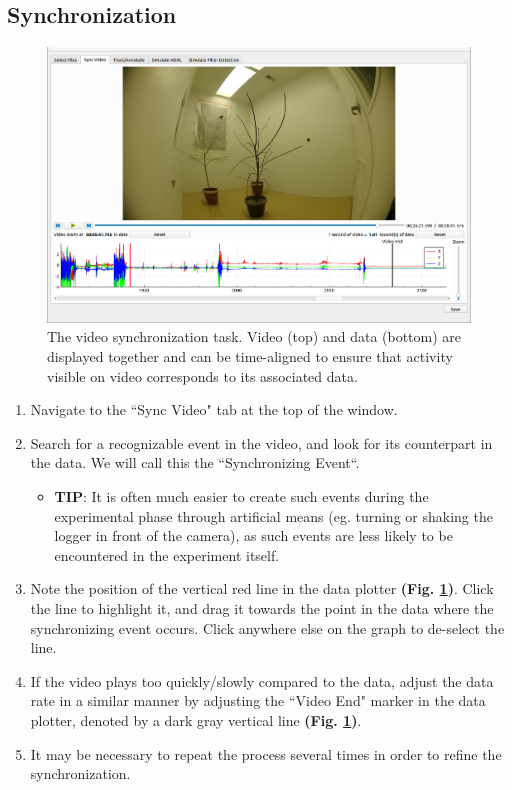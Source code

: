 \documentclass[]{article}
\begin{document}
	\subsection{Synchronization}
	\begin{figure}[H]
		\centering
		\includegraphics[width=1\linewidth]{syncvideo}
		\caption{The video synchronization task. Video (top) and data (bottom) are displayed together and can be time-aligned to ensure that activity visible on video corresponds to its associated data.}
		\label{fig:syncvideo}
	\end{figure}
	\begin{enumerate}
		\item Navigate to the ``Sync Video" tab at the top of the window. 
		\item Search for a recognizable event in the video, and look for its counterpart in the data. We will call this the ``Synchronizing Event``. 
			\begin{itemize}
				\item \textbf{TIP}: It is often much easier to create such events during the experimental phase through artificial means (eg. turning or shaking the logger in front of the camera), as such events are less likely to be encountered in the experiment itself.
			\end{itemize}
		\item Note the position of the vertical red line in the data plotter \textbf{(Fig. \ref{fig:syncvideo})}. Click the line to highlight it, and drag it towards the point in the data where the synchronizing event occurs. Click anywhere else on the graph to de-select the line.
		\item If the video plays too quickly/slowly compared to the data, adjust the data rate in a similar manner by adjusting the ``Video End" marker in the data plotter, denoted by a dark gray vertical line \textbf{(Fig. \ref{fig:syncvideo})}.
		\item It may be necessary to repeat the process several times in order to refine the synchronization.
	\end{enumerate}
	
\end{document}
